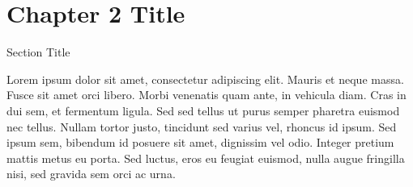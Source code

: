 \chapter{Chapter 2 Title}
\begin{section}{Section Title}

Lorem ipsum dolor sit amet, consectetur adipiscing elit. Mauris et neque massa. Fusce sit amet orci libero. Morbi venenatis quam ante, in vehicula diam. Cras in dui sem, et fermentum ligula. Sed sed tellus ut purus semper pharetra euismod nec tellus. Nullam tortor justo, tincidunt sed varius vel, rhoncus id ipsum. Sed ipsum sem, bibendum id posuere sit amet, dignissim vel odio. Integer pretium mattis metus eu porta. Sed luctus, eros eu feugiat euismod, nulla augue fringilla nisi, sed gravida sem orci ac urna.

\end{section}
